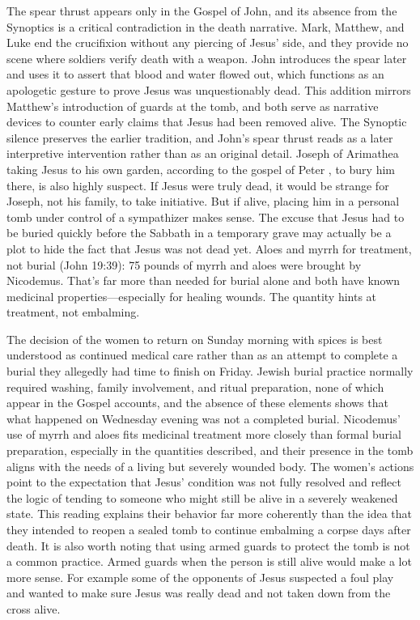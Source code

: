 The spear thrust appears only in the Gospel of John, and its absence from the Synoptics is a critical contradiction in the death narrative.
Mark, Matthew, and Luke end the crucifixion without any piercing of Jesus' side, and they provide no scene where soldiers verify death with a weapon.
John introduces the spear later and uses it to assert that blood and water flowed out, which functions as an apologetic gesture to prove Jesus was unquestionably dead.
This addition mirrors Matthew's introduction of guards at the tomb, and both serve as narrative devices to counter early claims that Jesus had been removed alive.
The Synoptic silence preserves the earlier tradition, and John's spear thrust reads as a later interpretive intervention rather than as an original detail.
Joseph of Arimathea taking Jesus to his own garden, according to the gospel of Peter \cite[6:24]{gospelpeter}, to bury him there, is also highly suspect.
If Jesus were truly dead, it would be strange for Joseph, not his family, to take initiative.
But if alive, placing him in a personal tomb under control of a sympathizer makes sense.
The excuse that Jesus had to be buried quickly before the Sabbath in a temporary grave may actually be a plot to hide the fact that Jesus was not dead yet.
Aloes and myrrh for treatment, not burial (John 19:39): 75 pounds of myrrh and aloes were brought by Nicodemus.
That's far more than needed for burial alone and both have known medicinal properties---especially for healing wounds.
The quantity hints at treatment, not embalming.

The decision of the women to return on Sunday morning with spices is best understood as continued medical care rather than as an attempt to complete a burial they allegedly had time to finish on Friday.
Jewish burial practice normally required washing, family involvement, and ritual preparation, none of which appear in the Gospel accounts, and the absence of these elements shows that what happened on Wednesday evening was not a completed burial.
Nicodemus' use of myrrh and aloes fits medicinal treatment more closely than formal burial preparation, especially in the quantities described, and their presence in the tomb aligns with the needs of a living but severely wounded body.
The women's actions point to the expectation that Jesus' condition was not fully resolved and reflect the logic of tending to someone who might still be alive in a severely weakened state.
This reading explains their behavior far more coherently than the idea that they intended to reopen a sealed tomb to continue embalming a corpse days after death.
It is also worth noting that using armed guards to protect the tomb is not a common practice.
Armed guards when the person is still alive would make a lot more sense.
For example some of the opponents of Jesus suspected a foul play and wanted to make sure Jesus was really dead and not taken down from the cross alive.

